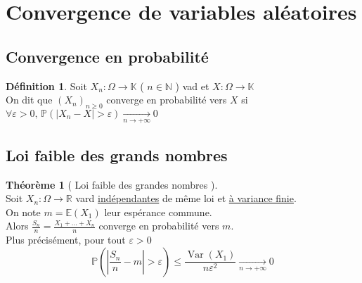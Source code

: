\documentclass[10pt,a4paper]{article}
\theoremstyle{definition}
\newtheorem{theorem}[proposition]{Théorème}
\newtheorem{definition}[proposition]{Définition}
\DeclareMathOperator{\var}{Var}
\begin{document}
\pagebreak

\section{Convergence de variables aléatoires}
\subsection{Convergence en probabilité}
\begin{definition}
    Soit \(X_n: \Omega \to \mathbb{K}\) ( \(n \in \mathbb{N}\) ) vad et \(X: \Omega \to \mathbb{K}\) \\
    On dit que \((X_n)_{n \geq 0}\) converge en probabilité vers \(X\) si \(\forall \varepsilon > 0,\, \mathbb{P}(|X_n - X| > \varepsilon) \xrightarrow[n \to +\infty]{} 0\)
\end{definition}

\subsection{Loi faible des grands nombres}
\begin{theorem}[ Loi faible des grandes nombres ]
    \hfill \\
    Soit \(X_n: \Omega \to \mathbb{R}\) vard \uline{indépendantes} de même loi et \uline{à variance finie}. \\
    On note \(m = \mathbb{E}(X_1)\) leur espérance commune. \\
    Alors \(\frac{S_n}{n} = \frac{X_1 + ... + X_n}{n}\) converge en probabilité vers \(m\). \\
    Plus précisément, pour tout \(\varepsilon > 0\)
    \[\boxed{\mathbb{P}\left(\left|\frac{S_n}{n} - m\right| > \varepsilon \right) \leq \frac{\var(X_1)}{n \varepsilon^2} \xrightarrow[n \to +\infty]{} 0}\]
\end{theorem}
\end{document}
